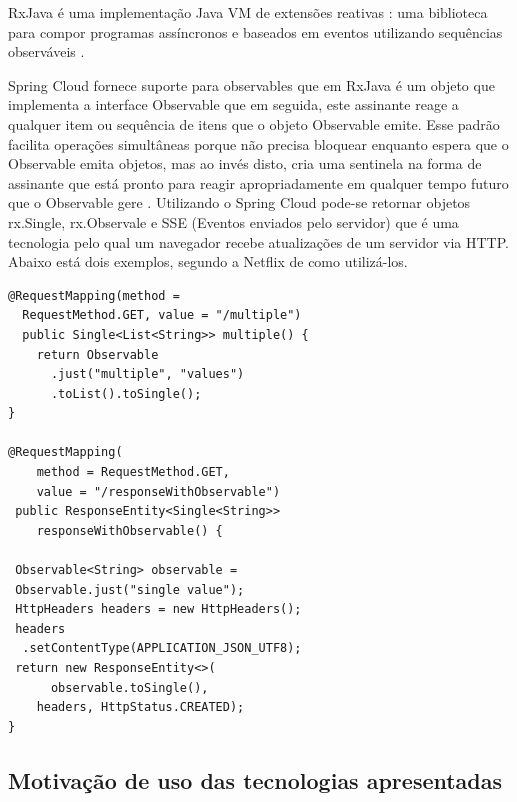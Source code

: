 \documentclass[journal]{IEEEtran}
\begin{document}
RxJava é uma implementação Java VM de extensões reativas : uma biblioteca para compor programas assíncronos e baseados em eventos utilizando sequências observáveis \cite{reactivex2017}.

Spring Cloud fornece suporte para observables que em RxJava é um objeto que implementa a interface Observable que em seguida, este assinante reage a qualquer item ou sequência de itens que o objeto Observable emite. Esse padrão facilita operações simultâneas porque não precisa bloquear enquanto espera que o Observable emita objetos, mas ao invés disto, cria uma sentinela na forma de assinante que está pronto para reagir apropriadamente em qualquer tempo futuro que o Observable gere \cite{reactivex2017}. Utilizando o Spring Cloud pode-se retornar objetos rx.Single, rx.Observale e SSE (Eventos enviados pelo servidor) que é uma tecnologia pelo qual um navegador recebe atualizações de um servidor via HTTP. Abaixo está dois exemplos, segundo a Netflix \cite{netflix2017SpringCloud} de como utilizá-los.

\begin{verbatim}
@RequestMapping(method =
  RequestMethod.GET, value = "/multiple")
  public Single<List<String>> multiple() {
    return Observable
      .just("multiple", "values")
      .toList().toSingle();
}

@RequestMapping(
    method = RequestMethod.GET, 
    value = "/responseWithObservable")
 public ResponseEntity<Single<String>> 
    responseWithObservable() {

 Observable<String> observable = 
 Observable.just("single value");
 HttpHeaders headers = new HttpHeaders();
 headers
  .setContentType(APPLICATION_JSON_UTF8);
 return new ResponseEntity<>(
      observable.toSingle(), 
    headers, HttpStatus.CREATED);
}
\end{verbatim}

\subsection{Motivação de uso das tecnologias apresentadas}
\end{document}
